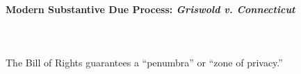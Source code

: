 % 
% 
% 
% 
% 
\paragraph{Modern Substantive Due Process: \emph{Griswold v. Connecticut}}
~\\\\
The Bill of Rights guarantees a ``penumbra'' or ``zone of privacy.''

